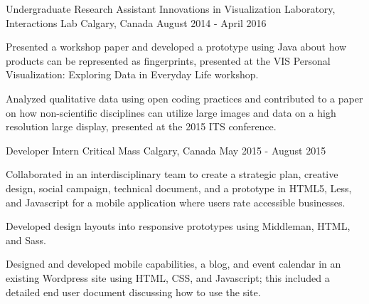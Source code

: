\begin{cventries}
  \cventry
    {Undergraduate Research Assistant}
    {Innovations in Visualization Laboratory, Interactions Lab}
    {Calgary, Canada}
    {August 2014 - April 2016}
    {
      \begin{cvitems}
       \item {Presented a workshop paper and developed a prototype using Java about how products can be represented as fingerprints, presented at the VIS Personal Visualization: Exploring Data in Everyday Life workshop.}
        \item {Analyzed qualitative data using open coding practices and contributed to a paper on how non-scientific disciplines can utilize large images and data on a high resolution large display, presented at the 2015 ITS conference.}
      \end{cvitems}
    }
  \cventry
    {Developer Intern}
    {Critical Mass}
    {Calgary, Canada}
    {May 2015 - August 2015}
    {
      \begin{cvitems}
        \item {Collaborated in an interdisciplinary team to create a strategic plan, creative design, social campaign, technical document, and a prototype in HTML5, Less, and Javascript for a mobile application where users rate accessible businesses.}
        \item {Developed design layouts into responsive prototypes using Middleman, HTML, and Sass.}
        \item {Designed and developed mobile capabilities, a blog, and event calendar in an existing Wordpress site using HTML, CSS, and Javascript; this included a detailed end user document discussing how to use the site.}
      \end{cvitems}
    }
 \end{cventries}
